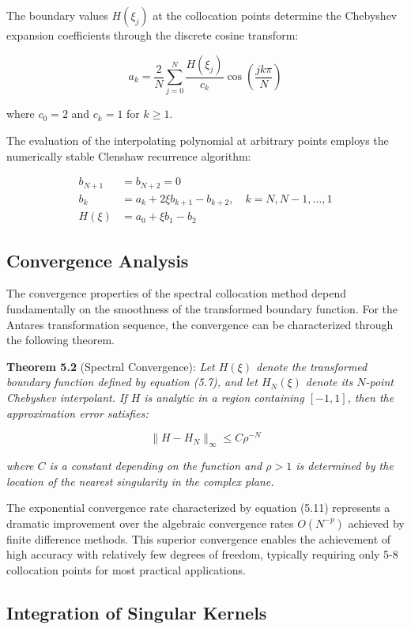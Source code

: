 \documentclass[
  american,
  11pt,
  11pt,
  letterpaper,
  onecolumn]{article}
\begin{document}
The boundary values \(H(\xi_j)\) at the collocation points determine the
Chebyshev expansion coefficients through the discrete cosine transform:

\[a_k = \frac{2}{N} \sum_{j=0}^{N} \frac{H(\xi_j)}{c_k} \cos\left(\frac{jk\pi}{N}\right) \tag{5.9}\]

where \(c_0 = 2\) and \(c_k = 1\) for \(k \geq 1\).

The evaluation of the interpolating polynomial at arbitrary points
employs the numerically stable Clenshaw recurrence algorithm:

\[\begin{aligned}
b_{N+1} &= b_{N+2} = 0 \\
b_k &= a_k + 2\xi b_{k+1} - b_{k+2}, \quad k = N, N-1, \ldots, 1 \\
H(\xi) &= a_0 + \xi b_1 - b_2
\end{aligned} \tag{5.10}\]

\subsection{Convergence Analysis}\label{convergence-analysis}

The convergence properties of the spectral collocation method depend
fundamentally on the smoothness of the transformed boundary function.
For the Antares transformation sequence, the convergence can be
characterized through the following theorem.

\textbf{Theorem 5.2} (Spectral Convergence): \emph{Let \(H(\xi)\) denote
the transformed boundary function defined by equation (5.7), and let
\(H_N(\xi)\) denote its \(N\)-point Chebyshev interpolant. If \(H\) is
analytic in a region containing \([-1,1]\), then the approximation error
satisfies:}

\[\|H - H_N\|_{\infty} \leq C \rho^{-N} \tag{5.11}\]

\emph{where \(C\) is a constant depending on the function and
\(\rho > 1\) is determined by the location of the nearest singularity in
the complex plane.}

The exponential convergence rate characterized by equation (5.11)
represents a dramatic improvement over the algebraic convergence rates
\(O(N^{-p})\) achieved by finite difference methods. This superior
convergence enables the achievement of high accuracy with relatively few
degrees of freedom, typically requiring only 5-8 collocation points for
most practical applications.

\subsection{Integration of Singular
Kernels}\label{integration-of-singular-kernels}
\end{document}
